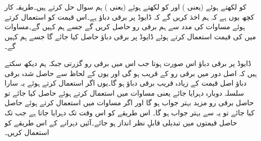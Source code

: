  کو  لکھتے ہوئے (یعنی ) اور
  کو   لکھتے ہوئے (یعنی ) ہم سوال حل کرتے ہیں۔طریقہ کار کچھ یوں ہے کہ ہم اخذ کریں گے کہ ڈایوڈ پر   برقی دباؤ ہے۔اس قیمت کو استعمال کرتے ہوئے مساوات   کی مدد سے ہم برقی رو حاصل کریں گے جسے ہم  کہیں گے۔مساوات   میں  کی قیمت استعمال کرتے ہوئے ڈایوڈ پر برقی دباؤ حاصل کیا جائے گا جسے ہم  کہیں گے۔

ڈایوڈ پر  برقی دباؤ اس صورت ہوتا جب اس میں  برقی رو گزرتی جبکہ ہم دیکھ سکتے ہیں کہ اصل دور میں برقی رو  کے قریب ہو گی اور یوں  کے   لحاظ   سے حاصل شدہ برقی دباؤ  اصل قیمت کے زیادہ قریب برقی دباؤ ہو گا۔یوں اگر   استعمال کرتے ہوئے یہ سارا سلسلہ دوبارہ دہرایا جائے یعنی مساوات   میں   استعمال کرتے ہوئے  حاصل کیا جائے تو حاصل برقی رو مزید بہتر جواب ہو گا اور اگر مساوات   میں  استعمال کرتے ہوئے  حاصل کیا جائے تو یہ  سے بہتر جواب ہو گا۔ اس طریقے کو اس وقت تک  دہرایا جاتا ہے جب تک حاصل قیمتوں میں تبدیلی قابلِ نظر انداز ہو جائے۔آئیں دہرانے کے اس طریقے کو استعمال کریں۔
 

